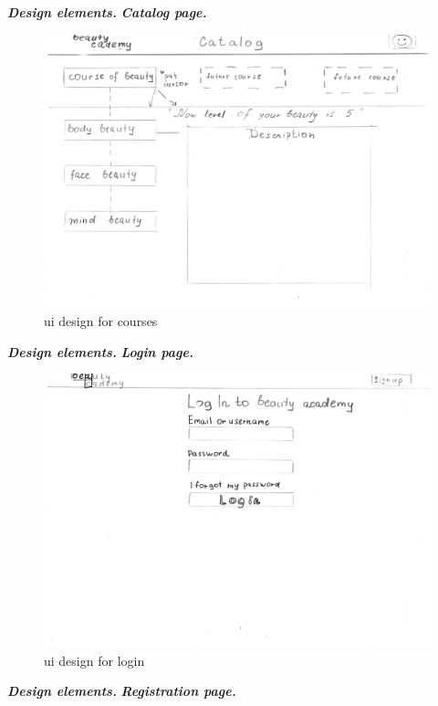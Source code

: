 \documentclass{scrartcl}
\begin{document}
\textbf{\textit{Design elements.}}
\textbf{\textit{Catalog page.}}

\begin{figure}[H]
\centering
\includegraphics[width = 140mm]{proto-foto/ui-courses.JPG}
\caption{ui design for courses}
\label{welcome page}
\end{figure}

\textbf{\textit{Design elements.}}
\textbf{\textit{Login page. }}

\begin{figure}[H]
\centering
\includegraphics[width = 140mm]{proto-foto/ui-login.JPG}
\caption{ui design for login}
\label{login page}
\end{figure}

\textbf{\textit{Design elements.}}
\textbf{\textit{Registration page.}}
\end{document}
